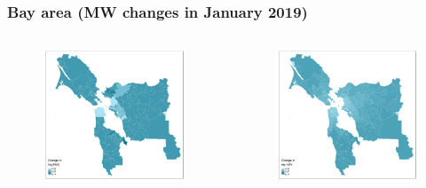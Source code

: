 \documentclass[aspectratio=169, t]{beamer}
\begin{document}
\begin{frame}[label = bay_example]
\frametitle{Bay area (MW changes in January 2019)}
    \begin{columns}
        \begin{column}{0.50\textwidth}
            \vspace{-4mm}
            \begin{figure}
                \centering
                \includegraphics[scale = 0.36]{maps_events/output/bay_area_2018-12_actual_mw.png}
            \end{figure}   
        \end{column}
        \begin{column}{0.50\textwidth}
            \vspace{-4mm}
            \begin{figure}
                \centering
                \includegraphics[scale = 0.36]{maps_events/output/bay_area2018-12_exp_mw.png}

\end{figure}
\end{column}
\end{columns}
\end{frame}
\end{document}
